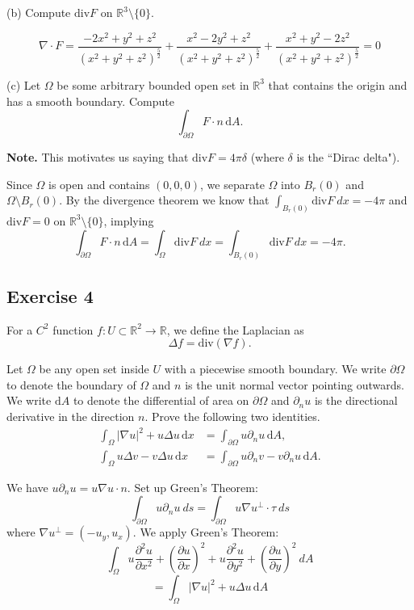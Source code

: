 \documentclass{amsart}
\newcommand{\R}{\mathbb R}
\newcommand{\dd}{\mathrm d}
\newcommand{\note}{\noindent \textbf{Note. }}
\begin{document}
\bigskip

(b) Compute $\mathrm{div} F$ on $\mathbb{R}^3\setminus\{0\}$.

\medskip \noindent \[\nabla\cdot F=\frac{-2x^2+y^2+z^2}{(x^2+y^2+z^2)^{\frac{5}{2}}}+
    \frac{x^2-2y^2+z^2}{(x^2+y^2+z^2)^{\frac{5}{2}}}+
    \frac{x^2+y^2-2z^2}{(x^2+y^2+z^2)^{\frac{5}{2}}}
=0\]

(c) Let $\Omega$ be some arbitrary bounded open set in $\R^3$ that contains the origin and has a smooth boundary. Compute
\begin{equation*}
\int_{\partial \Omega}F\cdot n \, \dd A.
\end{equation*}

\note This motivates us saying that $\mathrm{div}F=4\pi\delta$ (where $\delta$ is the ``Dirac delta").

\medskip \noindent Since $\Omega$ is open and contains $(0,0,0)$, we separate $\Omega$ into $B_r(0)$
and $\Omega\setminus B_r(0)$. By the divergence theorem we know that $\int_{B_r(0)}\mathrm{div} F\:dx=-4\pi$ and
$\mathrm{div} F=0$ on $\mathbb{R}^3\setminus \{0\}$, implying
\[\int_{\partial \Omega}F\cdot n \, \dd A=\int_{\Omega}\mathrm{div} F\:dx=\int_{B_r(0)}\mathrm{div} F\:dx=-4\pi.\]

\bigskip

\subsection*{Exercise 4} For a $C^2$ function $f:U\subset\mathbb{R}^2\rightarrow\mathbb{R}$, we define the Laplacian as
\begin{equation*}
\Delta f=\mathrm{div}(\nabla f).
\end{equation*}

\noindent Let $\Omega$ be any open set inside $U$ with a piecewise smooth boundary. We write $\partial\Omega$ to denote the boundary of $\Omega$ and $n$ is the unit normal vector pointing outwards. We write $\dd A$ to denote the differential of area on $\partial \Omega$ and $\partial_n u$ is the directional derivative in the direction $n$. Prove the following two identities.
\begin{align*}
\int_\Omega |\nabla u|^2 + u \Delta u \, \dd x &= \int_{\partial \Omega} u \partial_n u \, \dd A, \\
\int_\Omega u \Delta v - v \Delta u \, \dd x &= \int_{\partial \Omega} u \partial_n v - v \partial_n u \, \dd A.
\end{align*}

\medskip \noindent We have $u\partial_n u = u\nabla u\cdot n$. Set up Green's Theorem:
\[\int_{\partial\Omega}u\partial_n u\:ds=\int_{\partial\Omega}u\nabla u^{\perp}\cdot\tau\:ds\]
where $\nabla u^{\perp}=(-u_y, u_x)$. We apply Green's Theorem:
\[\int_{\Omega} u\frac{\partial^2u}{\partial x^2}+\left(\frac{\partial u}{\partial x}\right)^2+u\frac{\partial^2u}{\partial y^2}+\left(\frac{\partial u}{\partial y}\right)^2\:dA\]
\[= \int_\Omega |\nabla u|^2 + u \Delta u \, \dd A\]
\end{document}
